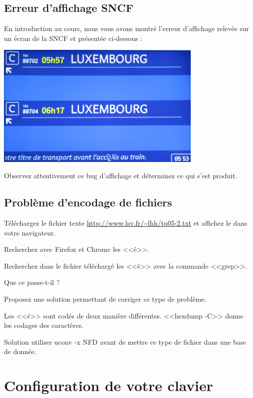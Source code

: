 \documentclass[11pt]{article}
\begin{document}
\subsection{Erreur d'affichage SNCF}

En introduction au cours, nous vous avons montré l'erreur d'affichage relevée
sur un écran de la SNCF et présentée ci-dessous : 

\begin{center}
\includegraphics[width=10cm]{gare.png}
\end{center}

Observez attentivement ce bug d'affichage et déterminez ce qui s'est produit.

\subsection{Problème d'encodage de fichiers}

Téléchargez le fichier texte \url{http://www.lsv.fr/~fhh/tp05-2.txt} et affichez le dans votre navigateur.

Recherchez avec Firefox et Chrome les <<é>>.

Recherchez dans le fichier téléchargé les <<é>> avec la commande <<grep>>.

Que ce passe-t-il ? 

Proposez une solution permettant de corriger ce type de problème.

\begin{solution}
Les <<é>> sont codés de deux manière différentes. <<hexdump -C>> donne les codages des caractères.

Solution utiliser uconv -x NFD avant de mettre ce type de fichier dans une base de donnée.
\end{solution}



\section{Configuration de votre clavier}
\end{document}
